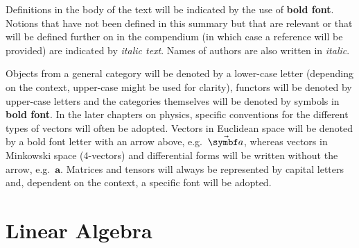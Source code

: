 \documentclass[12pt, a4paper]{report}
\begin{document}
   Definitions in the body of the text will be indicated by the use of \textbf{bold font}. Notions that have not been defined in this summary but that are relevant or that will be defined further on in the compendium (in which case a reference will be provided) are indicated by \textit{italic text}. Names of authors are also written in \textit{italic}.

   Objects from a general category will be denoted by a lower-case letter (depending on the context, upper-case might be used for clarity), functors will be denoted by upper-case letters and the categories themselves will be denoted by symbols in \textbf{bold font}. In the later chapters on physics, specific conventions for the different types of vectors will often be adopted. Vectors in Euclidean space will be denoted by a bold font letter with an arrow above, e.g.~$\vector{a}$, whereas vectors in Minkowski space (4-vectors) and differential forms will be written without the arrow, e.g.~$\symbf{a}$. Matrices and tensors will always be represented by capital letters and, dependent on the context, a specific font will be adopted.

% 
% 
% 
% 
% 

% 
% 
% 
% 
% 
% 
% 
% 

% 
% 
% 
% 
% 
% 

\part{Linear Algebra}
% 
% 
% 
% 
% 
% 

\end{document}

